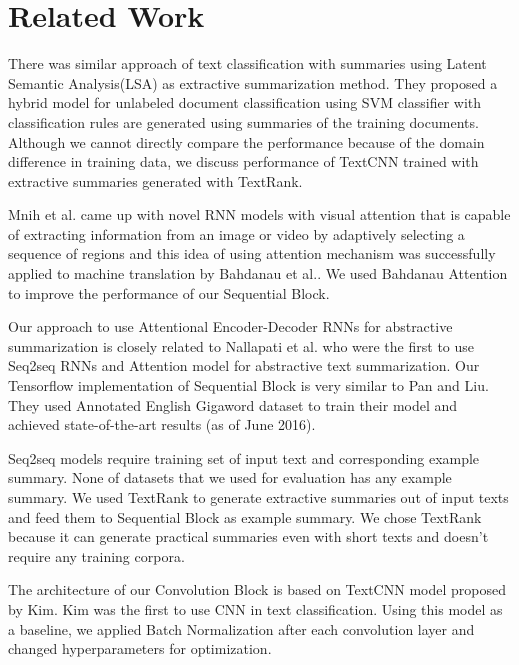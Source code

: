 \documentclass{article}
\begin{document}
\section{Related Work}

There was similar approach of text classification with summaries using Latent Semantic Analysis(LSA) as extractive summarization method\cite{articleLSA}. They proposed a hybrid model for unlabeled document classification using SVM classifier with classification rules are generated using summaries of the training documents. Although we cannot directly compare the performance because of the domain difference in training data, we discuss performance of TextCNN trained with extractive summaries generated with TextRank\cite{mihalcea-tarau:2004:EMNLP}.  

Mnih et al.\cite{DBLP:journals/corr/MnihHGK14} came up with novel RNN models with visual attention that is capable of extracting information from an image or video by adaptively selecting a sequence of regions and this idea of using attention mechanism was successfully applied to machine translation by Bahdanau et al.\cite{DBLP:journals/corr/BahdanauCB14}. We used Bahdanau Attention\cite{DBLP:journals/corr/BahdanauCB14} to improve the performance of our Sequential Block. 

Our approach to use Attentional Encoder-Decoder RNNs for abstractive summarization is closely related to Nallapati et al.\cite{DBLP:journals/corr/NallapatiXZ16} who were the first to use Seq2seq RNNs and Attention model for abstractive text summarization. Our Tensorflow\cite{tensorflow2015-whitepaper} implementation of Sequential Block is very similar to Pan and Liu\cite{tensorflow-seq2seq}. They used Annotated English Gigaword\cite{Napoles:2012:AG:2391200.2391218} dataset to train their model and achieved state-of-the-art results (as of June 2016).

Seq2seq models\cite{NIPS2014_5346,DBLP:journals/corr/NallapatiXZ16} require training set of input text and corresponding example summary. None of datasets that we used for evaluation has any example summary. We used TextRank\cite{mihalcea-tarau:2004:EMNLP} to generate extractive summaries out of input texts and feed them to Sequential Block as example summary. We chose TextRank\cite{mihalcea-tarau:2004:EMNLP} because it can generate practical summaries even with short texts and doesn’t require any training corpora.

The architecture of our Convolution Block is based on TextCNN model proposed by Kim\cite{DBLP:journals/corr/Kim14f}. Kim\cite{DBLP:journals/corr/Kim14f} was the first to use CNN in text classification. Using this model as a baseline, we applied Batch Normalization after each convolution layer and changed hyperparameters for optimization.  
\end{document}
